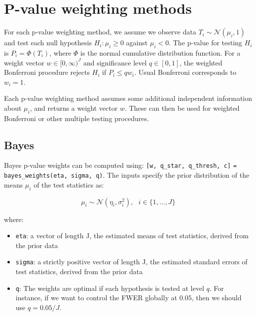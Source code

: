 \documentclass[english,11pt]{article} %
\begin{document}
%
%

\section{P-value weighting methods}
\label{methods}

For each p-value weighting method, we assume we observe data $T_i \sim \mathcal{N}(\mu_i, 1)$ and test each null hypothesis $H_i: \mu_i \ge 0$ against $\mu_i <0$.  The p-value for testing $H_i$ is $P_i = \Phi(T_i)$, where $\Phi$ is the normal cumulative distribution function.  For a weight vector $w \in [0,\infty)^{J}$ and significance level $q \in [0,1]$, the weighted Bonferroni procedure rejects $H_{i}$ if $P_i \le q w_i$. Usual Bonferroni corresponds to $w_i=1$.

Each p-value weighting method assumes some additional independent information about $\mu_i$, and returns a weight vector $w$. These can then be used for weighted Bonferroni or other multiple testing procedures.

\subsection{Bayes}


Bayes p-value weights can be computed using:  \verb+[w, q_star, q_thresh, c]+ \verb+= bayes_weights(eta, sigma, q)+. The inputs specify the prior distribution of the means $\mu_i $ of the test statistics as:

$$\mu_i \sim \mathcal{N}(\eta_i,\sigma_i^2), \mbox{   } i \in \{1,\ldots, J\}$$ 

where:

\begin{itemize}
\item \verb+eta+:  a vector of length J, the estimated means of test statistics, derived from the prior data
\item \verb+sigma+:  a strictly positive vector of length J, the estimated standard errors of test statistics, derived from the prior data
\item \verb+q+: The weights are optimal if each hypothesis is tested at level $q$. For instance, if we want to control the FWER globally at $0.05$, then we should use $q = 0.05/J$.
\end{itemize}
\end{document}
